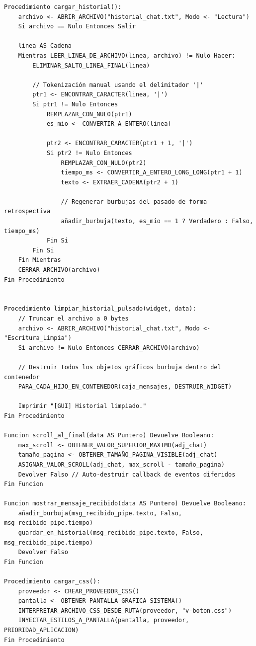 \begin{lstlisting}[style=estiloPseudo]
Procedimiento cargar_historial():
    archivo <- ABRIR_ARCHIVO("historial_chat.txt", Modo <- "Lectura")
    Si archivo == Nulo Entonces Salir

    linea AS Cadena
    Mientras LEER_LINEA_DE_ARCHIVO(linea, archivo) != Nulo Hacer:
        ELIMINAR_SALTO_LINEA_FINAL(linea)

        // Tokenización manual usando el delimitador '|'
        ptr1 <- ENCONTRAR_CARACTER(linea, '|')
        Si ptr1 != Nulo Entonces
            REMPLAZAR_CON_NULO(ptr1)
            es_mio <- CONVERTIR_A_ENTERO(linea)
            
            ptr2 <- ENCONTRAR_CARACTER(ptr1 + 1, '|')
            Si ptr2 != Nulo Entonces
                REMPLAZAR_CON_NULO(ptr2)
                tiempo_ms <- CONVERTIR_A_ENTERO_LONG_LONG(ptr1 + 1)
                texto <- EXTRAER_CADENA(ptr2 + 1)
                
                // Regenerar burbujas del pasado de forma retrospectiva
                añadir_burbuja(texto, es_mio == 1 ? Verdadero : Falso, tiempo_ms)
            Fin Si
        Fin Si
    Fin Mientras
    CERRAR_ARCHIVO(archivo)
Fin Procedimiento


Procedimiento limpiar_historial_pulsado(widget, data):
    // Truncar el archivo a 0 bytes
    archivo <- ABRIR_ARCHIVO("historial_chat.txt", Modo <- "Escritura_Limpia")
    Si archivo != Nulo Entonces CERRAR_ARCHIVO(archivo)

    // Destruir todos los objetos gráficos burbuja dentro del contenedor
    PARA_CADA_HIJO_EN_CONTENEDOR(caja_mensajes, DESTRUIR_WIDGET)
    
    Imprimir "[GUI] Historial limpiado."
Fin Procedimiento

Funcion scroll_al_final(data AS Puntero) Devuelve Booleano:
    max_scroll <- OBTENER_VALOR_SUPERIOR_MAXIMO(adj_chat)
    tamaño_pagina <- OBTENER_TAMAÑO_PAGINA_VISIBLE(adj_chat)
    ASIGNAR_VALOR_SCROLL(adj_chat, max_scroll - tamaño_pagina)
    Devolver Falso // Auto-destruir callback de eventos diferidos
Fin Funcion

Funcion mostrar_mensaje_recibido(data AS Puntero) Devuelve Booleano:
    añadir_burbuja(msg_recibido_pipe.texto, Falso, msg_recibido_pipe.tiempo)
    guardar_en_historial(msg_recibido_pipe.texto, Falso, msg_recibido_pipe.tiempo)
    Devolver Falso
Fin Funcion

Procedimiento cargar_css():
    proveedor <- CREAR_PROVEEDOR_CSS()
    pantalla <- OBTENER_PANTALLA_GRAFICA_SISTEMA()
    INTERPRETAR_ARCHIVO_CSS_DESDE_RUTA(proveedor, "v-boton.css")
    INYECTAR_ESTILOS_A_PANTALLA(pantalla, proveedor, PRIORIDAD_APLICACION)
Fin Procedimiento
\end{lstlisting}